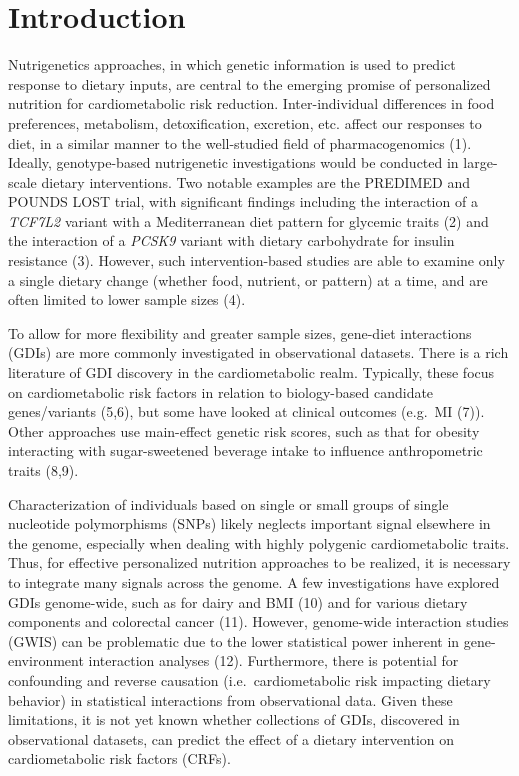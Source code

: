 \documentclass[]{article}
\begin{document}
\hypertarget{introduction}{%
\section{Introduction}\label{introduction}}

Nutrigenetics approaches, in which genetic information is used to
predict response to dietary inputs, are central to the emerging promise
of personalized nutrition for cardiometabolic risk reduction.
Inter-individual differences in food preferences, metabolism,
detoxification, excretion, etc. affect our responses to diet, in a
similar manner to the well-studied field of pharmacogenomics (1).
Ideally, genotype-based nutrigenetic investigations would be conducted
in large-scale dietary interventions. Two notable examples are the
PREDIMED and POUNDS LOST trial, with significant findings including the
interaction of a \emph{TCF7L2} variant with a Mediterranean diet pattern
for glycemic traits (2) and the interaction of a \emph{PCSK9} variant
with dietary carbohydrate for insulin resistance (3). However, such
intervention-based studies are able to examine only a single dietary
change (whether food, nutrient, or pattern) at a time, and are often
limited to lower sample sizes (4).

To allow for more flexibility and greater sample sizes, gene-diet
interactions (GDIs) are more commonly investigated in observational
datasets. There is a rich literature of GDI discovery in the
cardiometabolic realm. Typically, these focus on cardiometabolic risk
factors in relation to biology-based candidate genes/variants (5,6), but
some have looked at clinical outcomes (e.g.~MI (7)). Other approaches
use main-effect genetic risk scores, such as that for obesity
interacting with sugar-sweetened beverage intake to influence
anthropometric traits (8,9).

Characterization of individuals based on single or small groups of
single nucleotide polymorphisms (SNPs) likely neglects important signal
elsewhere in the genome, especially when dealing with highly polygenic
cardiometabolic traits. Thus, for effective personalized nutrition
approaches to be realized, it is necessary to integrate many signals
across the genome. A few investigations have explored GDIs genome-wide,
such as for dairy and BMI (10) and for various dietary components and
colorectal cancer (11). However, genome-wide interaction studies (GWIS)
can be problematic due to the lower statistical power inherent in
gene-environment interaction analyses (12). Furthermore, there is
potential for confounding and reverse causation (i.e.~cardiometabolic
risk impacting dietary behavior) in statistical interactions from
observational data. Given these limitations, it is not yet known whether
collections of GDIs, discovered in observational datasets, can predict
the effect of a dietary intervention on cardiometabolic risk factors
(CRFs).
\end{document}
